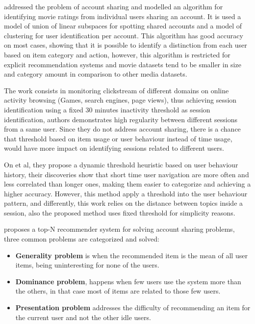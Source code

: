 \documentclass[ecp,tc,english]{iiufrgs}
\begin{document}
\cite{DBLP:journals/corr/ZhangFIM14} addressed the problem of account sharing and modelled an algorithm for identifying movie ratings from individual users sharing an account. It is used a model of union of linear subspaces for spotting shared accounts and a model of clustering for user identification per account. This algorithm has good accuracy on most cases, showing that it is possible to identify a distinction from each user based on item category and action, however, this algorithm is restricted for explicit recommendation systems and movie datasets tend to be smaller in size and category amount in comparison to other media datasets.

The work \cite{10.1145/2736277.2741117} consists in monitoring clickstream of different domains on online activity browsing (Games, search engines, page views), thus achieving session identification using a fixed 30 minutes inactivity threshold as session identification, authors demonstrates high regularity between different sessions from a same user. 
Since they do not address account sharing, there is a chance that threshold based on item usage or user behaviour instead of time usage, would have more impact on identifying sessions related to different users.

On \cite{JINDAL2020} et al, they propose a dynamic threshold heuristic based on user behaviour history, their discoveries show that short time user navigation are more often and less correlated than longer ones, making them easier to categorize and achieving a higher accuracy. However, this method apply a threshold into the user behaviour pattern, and differently, this work relies on the distance between topics inside a session, also the proposed method uses fixed threshold for simplicity reasons.

\cite{10.1145/2792838.2800170} proposes a top-N recommender system for solving account sharing problems, three common problems are categorized and solved:
\begin{itemize}
    \item \textbf{Generality problem} is when the recommended item is the mean of all user items, being uninteresting for none of the users.
    \item \textbf{Dominance problem}, happens when few users use the system more than the others, in that case most of items are related to those few users.
    \item \textbf{Presentation problem} addresses the difficulty of recommending an item for the current user and not the other idle users.
\end{itemize}
\end{document}
